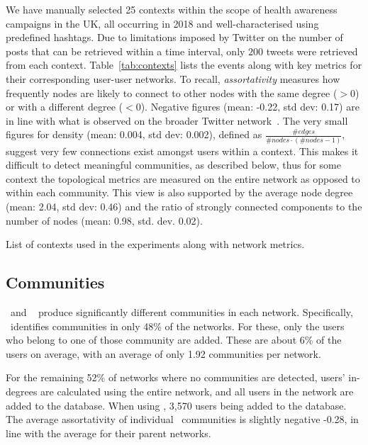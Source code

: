We have manually selected 25 contexts within the scope of health awareness campaigns in the UK, all occurring in 2018 and well-characterised using predefined hashtags.
Due to limitations imposed by Twitter on the number of posts that can be retrieved within a time interval, only $200$ tweets were retrieved from each context.
 Table~\ref{tab:contexts} lists the events along with key metrics for their corresponding user-user networks. 
To recall, \textit{assortativity} measures how frequently nodes are likely to connect to other nodes with the same degree ($>0$) or with a different degree ($<0$). 
Negative figures (mean: -0.22, std dev: 0.17) are in line with what is observed on the broader Twitter network~\cite{Fisher2017}.
%
The very small figures for density (mean: 0.004, std dev: 0.002), defined as $\frac{\#edges }{\mathit{\mathit{\#nodes}} \cdot (\mathit{\#nodes} -1)}$, suggest very few connections exist amongst users within a context. 
This makes it difficult to detect meaningful communities, as described below, thus for some context the topological metrics are measured on the entire network as opposed to within each community.
This view is also supported by the average node degree (mean: 2.04, std dev: 0.46) and the ratio of strongly connected components to the number of nodes (mean: 0.98, std. dev. 0.02).

\begin{table}
	\tiny
	\resizebox{\textwidth}{!}{
	    
	}
	\caption{List of contexts used in the experiments along with network metrics.}
	\label{tab:contexts}
\end{table}

\subsection{Communities}  \label{sec:communities-eval}

 \demon~and \infomap~ produce significantly different communities in each network. 
%
Specifically, \demon~identifies communities in only 48\% of the networks.
For these, only the users who belong to one of those community are added. 
These are about 6\% of the users on average, with an average of only 1.92 communities per network.

For the remaining 52\% of networks where no communities are detected, users' in-degrees are calculated using the entire network, and all users in the network are added to the database.
%
When using \demon, 3,570 users being added to the database.
The average assortativity of individual \demon~communities is slightly negative -0.28, in line with the average for their parent networks.

